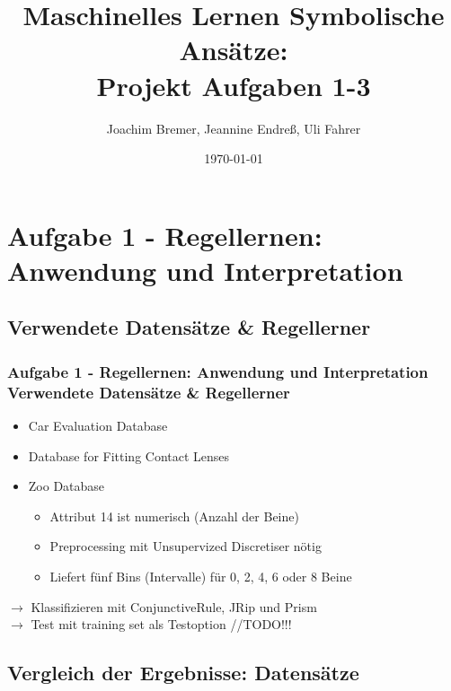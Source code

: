 \documentclass[accentcolor=tud6b,colorbacktitle,inverttitle,landscape,german,presentation,t]{tudbeamer}
\begin{document}
\title[MLDM: Projekt Aufgabe 1-3]{Maschinelles Lernen Symbolische Ansätze:\\ Projekt Aufgaben 1-3}
\subtitle{}

\author[bremer\_endreß\_fahrer]{Joachim Bremer, Jeannine Endreß, Uli Fahrer}

\date{\today}

\begin{titleframe}
\tableofcontents
\end{titleframe}

    \section{Aufgabe 1 - Regellernen: Anwendung und Interpretation}
    
    \subsection{Verwendete Datensätze \& Regellerner}
    
    \begin{frame}[t]
    \frametitle{Aufgabe 1 - Regellernen: Anwendung und Interpretation\\ Verwendete Datensätze \& Regellerner}
        \begin{itemize}
            \item Car Evaluation Database
            \item Database for Fitting Contact Lenses
            \item Zoo Database
            \begin{itemize}
                \item Attribut 14 ist numerisch (Anzahl der Beine)
                \item Preprocessing mit Unsupervized Discretiser nötig
                \item Liefert fünf Bins (Intervalle) für 0, 2, 4, 6 oder 8 Beine
            \end{itemize}
        \end{itemize}
        \vfill
        $\rightarrow$ Klassifizieren mit ConjunctiveRule, JRip und Prism\\
        $\rightarrow$ Test mit training set als Testoption //TODO!!!
    \end{frame}
    
    \subsection{Vergleich der Ergebnisse: Datensätze}
    
\end{document}
